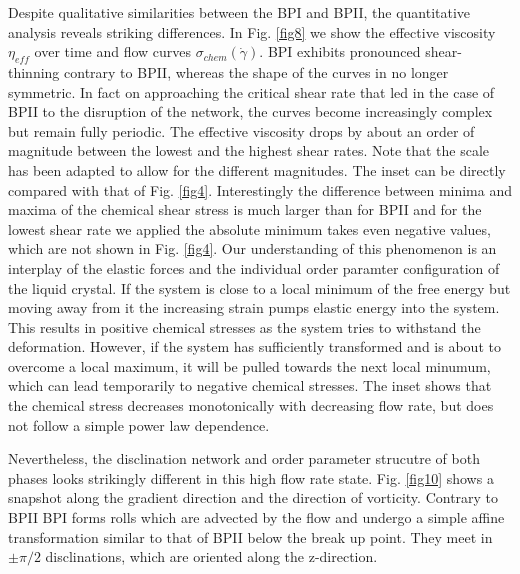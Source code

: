 \documentclass[aps,pre,reprint,superscriptaddress]{revtex4}
\begin{document}
Despite qualitative similarities between the BPI and BPII, the quantitative analysis reveals striking differences.
In Fig. \ref{fig8} we show the effective viscosity $\eta_{eff}$ over time and flow curves $\sigma_{chem}(\dot{\gamma})$. 
BPI exhibits pronounced shear-thinning contrary to BPII, whereas the shape of the curves in no longer symmetric.
In fact on approaching the critical shear rate that led in the case of BPII to the disruption of the network, the curves become increasingly complex but remain fully periodic.
The effective viscosity drops by about an order of magnitude between the lowest and the highest shear rates.
Note that the scale has been adapted to allow for the different magnitudes.
The inset can be directly compared with that of Fig. \ref{fig4}.
Interestingly the difference between minima and maxima of the chemical shear stress is much larger than for BPII and for the lowest shear rate we applied the absolute minimum takes even negative values, which are not shown in Fig. \ref{fig4}.
Our understanding of this phenomenon is an interplay of the elastic forces and the individual order paramter configuration of the liquid crystal.
If the system is close to a local minimum of the free energy but moving away from it the increasing strain pumps elastic energy into the system. 
This results in positive chemical stresses as the system tries to withstand the deformation.
However, if the system has sufficiently transformed and is about to overcome a local maximum, it will be pulled towards the next local minumum, which can lead temporarily to negative chemical stresses. 
The inset shows that the chemical stress decreases monotonically with decreasing flow rate, but does not follow a simple power law dependence.

Nevertheless, the disclination network and order parameter strucutre of both phases looks strikingly different in this high flow rate state.
Fig. \ref{fig10} shows a snapshot along the gradient direction and the direction of vorticity.
Contrary to BPII BPI forms rolls which are advected by the flow and undergo a simple affine transformation similar to that of BPII below the break up point.
They meet in $\pm\pi/2$ disclinations, which are oriented along the z-direction.
\end{document}

